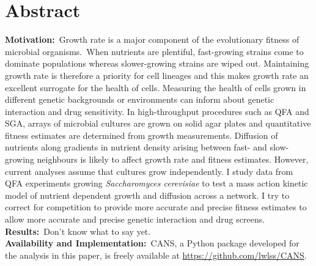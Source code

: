 \section*{Abstract}
\label{sec:abstract}

\textbf{Motivation:}~Growth rate is a major component of the
evolutionary fitness of microbial organisms.~When nutrients are
plentiful, fast-growing strains come to dominate populations whereas
slower-growing strains are wiped out. Maintaining growth rate is
therefore a priority for cell lineages and this makes growth rate an
excellent surrogate for the health of cells. Measuring the health of
cells grown in different genetic backgrounds or environments can
inform about genetic interaction and drug sensitivity. In
high-throughput procedures such as QFA and SGA, arrays of microbial
cultures are grown on solid agar plates and quantitative fitness
estimates are determined from growth measurements. Diffusion of
nutrients along gradients in nutrient density arising between fast-
and slow-growing neighbours is likely to affect growth rate and
fitness estimates. However, current analyses assume that cultures grow
independently. I study data from QFA experiments growing
\textit{Saccharomyces cerevisiae} to test a mass action kinetic model
of nutrient dependent growth and diffusion across a network. I try to
correct for competition to provide more accurate and precise fitness
estimates to allow more accurate and precise genetic interaction and
drug screens.
\\
\textbf{Results:}~Don't know what to say yet.\\
\textbf{Availability and Implementation:}~CANS, a Python package
developed for the analysis in this paper, is freely available at
\href{https://github.com/lwlss/CANS}{https://github.com/lwlss/CANS}.
